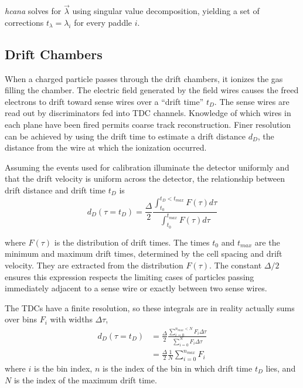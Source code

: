 \begin{itemize}
\textit{hcana} solves for $\vec{\lambda}$ using singular value
decomposition, yielding a set of corrections $t_\lambda = \lambda_i$ for every
paddle $i$.


\end{itemize}

\subsection{Drift Chambers}
When a charged particle passes through the drift chambers, it ionizes the gas
filling the chamber.
The electric field generated by the field wires causes the freed electrons to
drift toward sense wires over a ``drift time'' $t_D$.
The sense wires are read out by discriminators fed into TDC channels.
Knowledge of which wires in each plane have been fired permits coarse track
reconstruction.
Finer resolution can be achieved by using the drift time to estimate a drift
distance $d_D$, the distance from the wire at which the ionization occurred.


Assuming the events used for calibration illuminate the detector uniformly
and that the drift velocity is uniform across the detector, the relationship
between drift distance and drift time $t_D$ is
\begin{equation}
    d_D (\tau=t_D) = \frac{\Delta}{2}
                     \frac{\int_{t_0}^{t_D<t_{max}} F(\tau) d\tau}
                          {\int_{t_0}^{t_{max}} F(\tau) d\tau}
\end{equation}

where $F(\tau)$ is the distribution of drift times.
The times $t_0$ and $t_{max}$ are the minimum and maximum drift times,
determined by the cell spacing and drift velocity.
They are extracted from the distribution $F(\tau)$.
The constant $\Delta/2$ ensures this expression respects the limiting cases of
particles passing immediately adjacent to a sense wire or exactly between
two sense wires.


The TDCs have a finite resolution, so these integrals are in reality actually
sums over bins $F_i$ with widths $\Delta\tau$,
\begin{align} \label{eqn:drift_distance}
    d_D (\tau=t_D) &= \frac{\Delta}{2}
                      \frac{\sum_{i=0}^{n_{max}<N} F_i \Delta\tau}
                           {\sum_{i=0}^{N} F_i \Delta\tau} \\
                 &= \frac{\Delta}{2}
                    \frac{1}{N}\sum_{i=0}^{n_{max}} F_i
\end{align}
where $i$ is the bin index,
$n$ is the index of the bin in which drift time $t_D$ lies,
and $N$ is the index of the maximum drift time.


